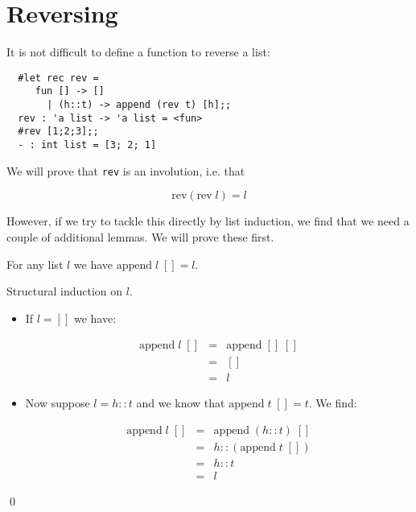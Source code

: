 \section{Reversing}

It is not difficult to define a function to reverse a list:

\begin{boxed}\begin{verbatim}
  #let rec rev =
     fun [] -> []
       | (h::t) -> append (rev t) [h];;
  rev : 'a list -> 'a list = <fun>
  #rev [1;2;3];;
  - : int list = [3; 2; 1]
\end{verbatim}\end{boxed}

\noindent We will prove that {\tt rev} is an involution, i.e. that

$$ \mbox{rev} (\mbox{rev}\; l) = l $$

However, if we try to tackle this directly by list induction, we find that we
need a couple of additional lemmas. We will prove these first.

\begin{lemma}

For any list $l$ we have $\mbox{append}\; l\; [] = l$.

\proof Structural induction on $l$.

\begin{itemize}

\item If $l = []$ we have:

\begin{eqnarray*}
\mbox{append}\; l\; []
& = & \mbox{append}\; []\; []                                           \\
& = & []                                                                \\
& = & l
\end{eqnarray*}

\item Now suppose $l = h::t$ and we know that $\mbox{append}\; t\; [] = t$. We
find:

\begin{eqnarray*}
\mbox{append}\; l\; []
& = & \mbox{append}\; (h::t)\; []                                       \\
& = & h::(\mbox{append}\; t\; [])                                       \\
& = & h::t                                                              \\
& = & l
\end{eqnarray*}

\end{itemize}

\qed

\end{lemma}



